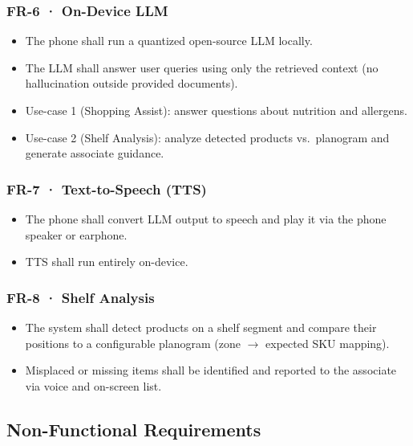 \documentclass[11pt,a4paper]{article}
\begin{document}
\subsubsection{FR-6 · On-Device LLM}
\begin{itemize}[noitemsep]
  \item The phone shall run a quantized open-source LLM locally.
  \item The LLM shall answer user queries using only the retrieved context
        (no hallucination outside provided documents).
  \item Use-case 1 (Shopping Assist): answer questions about nutrition and
        allergens.
  \item Use-case 2 (Shelf Analysis): analyze detected products vs.\ planogram
        and generate associate guidance.
\end{itemize}

\subsubsection{FR-7 · Text-to-Speech (TTS)}
\begin{itemize}[noitemsep]
  \item The phone shall convert LLM output to speech and play it via the phone
        speaker or earphone.
  \item TTS shall run entirely on-device.
\end{itemize}

\subsubsection{FR-8 · Shelf Analysis}
\begin{itemize}[noitemsep]
  \item The system shall detect products on a shelf segment and compare their
        positions to a configurable planogram (zone $\rightarrow$ expected SKU mapping).
  \item Misplaced or missing items shall be identified and reported to the
        associate via voice and on-screen list.
\end{itemize}

\subsection{Non-Functional Requirements}
\end{document}
